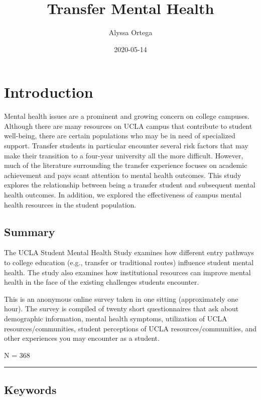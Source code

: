 \documentclass[]{book}
\title{Transfer Mental Health}
\author{Alyssa Ortega}
\date{2020-05-14}
\begin{document}
\maketitle

{
\setcounter{tocdepth}{1}
\tableofcontents
}
\hypertarget{introduction}{%
\chapter{Introduction}\label{introduction}}

Mental health issues are a prominent and growing concern on college campuses. Although there are many resources on UCLA campus that contribute to student well-being, there are certain populations who may be in need of specialized support. Transfer students in particular encounter several risk factors that may make their transition to a four-year university all the more difficult. However, much of the literature surrounding the transfer experience focuses on academic achievement and pays scant attention to mental health outcomes. This study explores the relationship between being a transfer student and subsequent mental health outcomes. In addition, we explored the effectiveness of campus mental health resources in the student population.

\hypertarget{summary}{%
\section{Summary}\label{summary}}

The UCLA Student Mental Health Study examines how different entry pathways to college education (e.g., transfer or traditional routes) influence student mental health. The study also examines how institutional resources can improve mental health in the face of the existing challenges students encounter.

This is an anonymous online survey taken in one sitting (approximately one hour). The survey is compiled of twenty short questionnaires that ask about demographic information, mental health symptoms, utilization of UCLA resources/communities, student perceptions of UCLA resources/communities, and other experiences you may encounter as a student.

N = 368

\begin{center}\rule{0.5\linewidth}{0.5pt}\end{center}

\hypertarget{keywords}{%
\section{Keywords}\label{keywords}}
\end{document}
